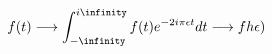 \documentclass[preview]{standalone}
\begin{document}
\begin{align*}
f(t) \longrightarrow   \int^{i \infinity}_{- \infinity} f(t) e^{-2 i \pi \epsilon t}dt   \longrightarrow f^^(\epsilon)
\end{align*}
\end{document}

